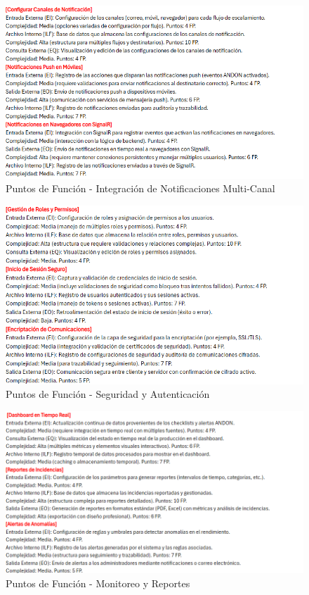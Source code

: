 \documentclass[12pt,letterpaper,spanish, xcolor=table]{report}
\numberwithin{figure}{subsection}
\begin{document}
	\begin{figure}[H]
		\centering
		\includegraphics[width=1.0\textwidth]
		{Imagenes/PathAyuda/FpsMultiCanal.png}
		\caption{Puntos de Función - Integración de Notificaciones Multi-Canal
		}\label{a2}
	\end{figure}
	
	\begin{figure}[H]
		\centering
		\includegraphics[width=1.0\textwidth]
		{Imagenes/PathAyuda/FpsSeguridadAutenticacion.png}
		\caption{Puntos de Función - Seguridad y Autenticación
		}\label{a2}
	\end{figure}
	
	\begin{figure}[H]
		\centering
		\includegraphics[width=1.0\textwidth]
		{Imagenes/PathAyuda/FpsMonitoreoReportes.png}
		\caption{Puntos de Función - Monitoreo y Reportes
		}\label{a2}
	\end{figure}
	
\end{document}
